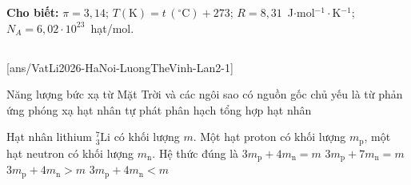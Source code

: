 \newcommand{\LTVhat}[3]{%
	\if#3p\filldraw[fill=VLdo!85!black,draw=black,thin] (#1,#2) circle (0.15);\node[white,inner sep=0pt,font=\fontsize{6}{6}\selectfont] at (#1,#2) {p$^{+}$};\fi
	\if#3n\filldraw[fill=black!75,draw=black,thin] (#1,#2) circle (0.15);\node[white,inner sep=0pt,font=\fontsize{6}{6}\selectfont] at (#1,#2) {n$^{0}$};\fi
	\if#3e\filldraw[fill=VLxanh!80!black,draw=black,thin] (#1,#2) circle (0.15);\node[white,inner sep=0pt,font=\fontsize{6}{6}\selectfont] at (#1,#2) {e$^{-}$};\fi}
\newcommand{\LTVkhungpV}{%
	\draw[gray!55,densely dashed,thin] (0,0) grid[step=1] (5,5);
	\draw[VLmui,thick] (0,0)--(6.2,0) node[right,inner sep=1pt] {$V$ (l)};
	\draw[VLmui,thick] (0,0)--(0,6.1) node[right,inner sep=2pt] {$p$ (atm)};
	\node[below left,inner sep=1.5pt] at (0,0) {O};
	\node[below,inner sep=2pt] at (1,0) {$1$};
	\node[below,inner sep=2pt] at (4,0) {$4$};
	\node[left,inner sep=2pt] at (0,1) {$1$};
	\node[left,inner sep=2pt] at (0,4) {$4$};}


	\noindent\textbf{Cho biết:} $\pi=3{,}14$; $T(\text{K})=t\,(^\circ\text{C})+273$; $R=8{,}31$~J$\cdot$mol$^{-1}\cdot$K$^{-1}$; $N_A=6{,}02\cdot 10^{23}$~hạt/mol.

	\noindent
	\subsection*{}
	\setcounter{ex}{0}
	[ans/VatLi2026-HaNoi-LuongTheVinh-Lan2-1]

	\begin{ex}%
		Năng lượng bức xạ từ Mặt Trời và các ngôi sao có nguồn gốc chủ yếu là từ phản ứng
		\choice
		{phóng xạ}
		{hạt nhân tự phát}
		{phân hạch}
		{\True tổng hợp hạt nhân}
	\end{ex}

	\begin{ex}%
		Hạt nhân lithium ${}^7_3\text{Li}$ có khối lượng $m$. Một hạt proton có khối lượng $m_\text{p}$, một hạt neutron có khối lượng $m_\text{n}$. Hệ thức đúng là
		\choice
		{$3m_\text{p}+4m_\text{n}=m$}
		{$3m_\text{p}+7m_\text{n}=m$}
		{\True $3m_\text{p}+4m_\text{n}>m$}
		{$3m_\text{p}+4m_\text{n}<m$}
	\end{ex}

